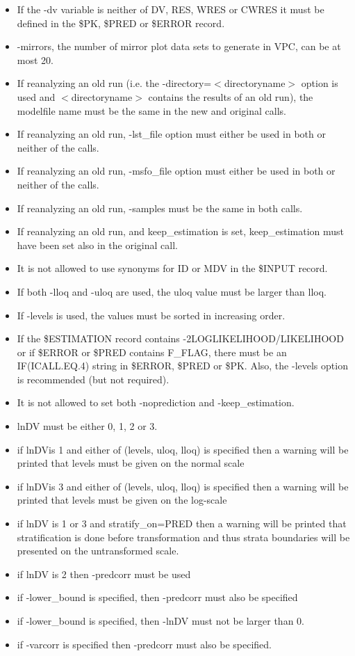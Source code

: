 \begin{itemize}
	\item If the -dv variable is neither of DV, RES, WRES or CWRES it must be defined in the \$PK, \$PRED or \$ERROR record. 
	\item -mirrors, the number of mirror plot data sets to generate in VPC, can be at most 20.
	\item If reanalyzing an old run (i.e. the -directory=$<$directoryname$>$ option is used and $<$directoryname$>$ contains the results of an old run), the modelfile name must be the same in the new and original calls.
	\item If reanalyzing an old run, -lst\_file option must either be used in both or neither of the calls.
	\item If reanalyzing an old run, -msfo\_file option must either be used in both or neither of the calls.
	\item If reanalyzing an old run, -samples must be the same in both calls.
	\item If reanalyzing an old run, and keep\_estimation is set, keep\_estimation must have been set also in the original call.
	\item It is not allowed to use synonyms for ID or MDV in the \$INPUT record.
	\item If both -lloq and -uloq are used, the uloq value must be larger than lloq.
	\item If -levels is used, the values must be sorted in increasing order.
	\item If the \$ESTIMATION record contains -2LOGLIKELIHOOD/LIKELIHOOD or if \$ERROR or \$PRED contains F\_FLAG, there must be an IF(ICALL.EQ.4) string in \$ERROR, \$PRED or \$PK. Also, the -levels option is recommended (but not required). 
	\item It is not allowed to set both -noprediction and -keep\_estimation.
	\item lnDV must be either 0, 1, 2 or 3.
	\item if lnDVis 1 and either of (levels, uloq, lloq) is specified then a warning will be printed that levels must be given on the normal scale
	\item if lnDVis 3 and either of (levels, uloq, lloq) is specified then a warning will be printed that levels must be given on the log-scale
	\item if lnDV is 1 or 3 and stratify\_on=PRED then a warning will be printed that stratification is done before transformation and thus strata boundaries will be presented on the untransformed scale.
	\item if lnDV is 2 then -predcorr must be used 
	\item if -lower\_bound is specified, then -predcorr must also be specified
	\item if -lower\_bound is specified, then -lnDV must not be larger than 0.
	\item if -varcorr is specified then -predcorr must also be specified.
\end{itemize}

